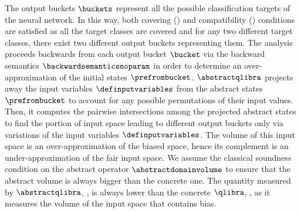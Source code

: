 The output buckets $\buckets$ represent all the possible classification targets of the neural network.
In this way, both covering () and compatibility () conditions are satisfied as all the target classes are covered and for any two different target classes, there exist two different output buckets representing them.
The analysis proceeds backwards from each output bucket $\bucket$ via the backward semantics $\backwardsemanticsnoparam$ in order to determine an over-approximation of the initial states $\prefrombucket$.
$\abstractqlibra$ projects away the input variables $\definputvariables$ from the abstract states $\prefrombucket$ to account for any possible permutations of their input values.
Then, it computes the pairwise intersections among the projected abstract states to find the portion of input space leading to different output buckets only via variations of the input variables $\definputvariables$.
The volume of this input space is an over-approximation of the biased space, hence its complement is an under-approximation of the fair input space.
We assume the classical soundness condition on the abstract operator $\abstractdomainvolume$ to ensure that the abstract volume is always bigger than the concrete one.
The quantity measured by $\abstractqlibra$, \cf{} , is always lower than the concrete $\qlibra$, \cf{} , as it measures the volume of the input space that contains bias.

